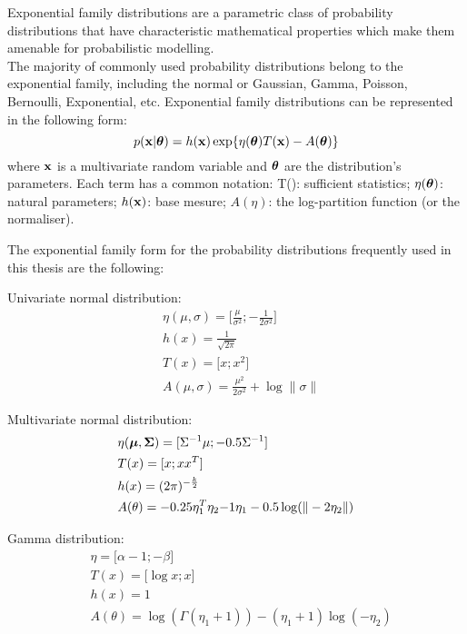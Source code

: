 Exponential family distributions are a parametric class of probability distributions that have characteristic mathematical properties which make them amenable for probabilistic modelling.\\
The majority of commonly used probability distributions belong to the exponential family, including the normal or Gaussian, Gamma, Poisson, Bernoulli, Exponential, etc. Exponential family distributions can be represented in the following form:
\begin{equation} \label{eq:exponential_family}
	p({\bf x}|\mbox{\boldmath $\theta$}) = h({\bf x}) \exp \{ \eta(\mbox{\boldmath $\theta$}) T({\bf x}) - A(\mbox{\boldmath $\theta$}) \}
\end{equation}
where ${\bf x}$ is a multivariate random variable and $\mbox{\boldmath $\theta$}$ are the distribution's parameters. Each term has a common notation: T(\bfx): sufficient statistics; $\eta(\mbox{\boldmath $\theta$})$: natural parameters; $h({\bf x})$: base mesure; $A(\eta)$: the log-partition function (or the normaliser).

The exponential family form for the probability distributions frequently used in this thesis are the following:

Univariate normal distribution:
\begin{align*}
	& \eta(\mu,\sigma) = \lbrack \frac{\mu}{\sigma^2}; -\frac{1}{2\sigma^2} \rbrack \\
	& h(x) = \frac{1}{\sqrt{2\pi}} \\
	& T(x) = \lbrack x; x^2 \rbrack \\
	& A(\mu,\sigma) = \frac{\mu^2}{2\sigma^2} + \log \| \sigma \|
\end{align*}

Multivariate normal distribution:
\begin{align*}
	& \eta(\mbox{\boldmath $\mu$},\mbox{\boldmath $\Sigma$})  = \lbrack\Sigma^{-1} \mu; -0.5\Sigma^{-1} \rbrack \\
	& T(x) = \lbrack x; xx^T \rbrack \\
	& h(x) = (2\pi)^{-\frac{k}{2}} \\
	& A(\theta) = -0.25\eta_1^T \eta_2{-1} \eta_1 - 0.5\log(\|-2\eta_2\|)
\end{align*}

Gamma distribution:
\begin{align*}
	& \eta = \lbrack \alpha - 1; -\beta \rbrack \\
	& T(x) = \lbrack \log x; x \rbrack \\
	& h(x) = 1 \\
	& A(\theta) = \log(\Gamma(\eta_1 + 1)) - (\eta_1 + 1) \log(-\eta_2)
\end{align*}

